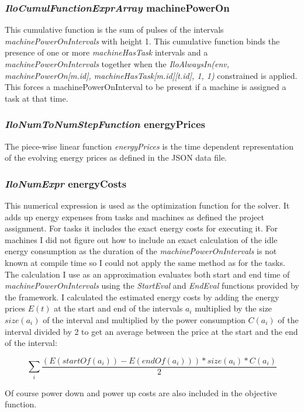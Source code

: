 \subsubsection{\textit{IloCumulFunctionExprArray} machinePowerOn}

This cumulative function is the sum of pulses of the intervals \textit{machinePowerOnIntervals} with height 1.
This cumulative function binds the presence of one or more \textit{machineHasTask} intervals and a \textit{machinePowerOnIntervals} together when the \textit{IloAlwaysIn(env, machinePowerOn[m.id], machineHasTask[m.id][t.id], 1, 1)} constrained is applied. This forces a machinePowerOnInterval to be present if a machine is assigned a task at that time. 

\subsubsection{\textit{IloNumToNumStepFunction} energyPrices}

The piece-wise linear function \textit{energyPrices} is the time dependent representation of the evolving energy prices as defined in the JSON data file.


\subsubsection{\textit{IloNumExpr} energyCosts}
This numerical expression is used as the optimization function for the solver. It adds up energy expenses from tasks and machines as defined the project assignment. For tasks it includes the exact energy costs for executing it. For machines I did not figure out how to include an exact calculation of the idle energy consumption as the duration of the \textit{machinePowerOnIntervals} is not known at compile time so I could not apply the same method as for the tasks. The calculation I use as an approximation evaluates both start and end time of \textit{machinePowerOnIntervals} using the \textit{StartEval} and \textit{EndEval} functions provided by the framework. I calculated the estimated energy costs by adding the energy prices $E(t)$ at the start and end of the intervals $a_i$ multiplied by the size $size(a_i)$ of the interval and multiplied by the power consumption $C(a_i)$ of the interval divided by 2 to get an average between the price at the start and the end of the interval:

\[ \sum_i{\frac{(E(startOf(a_i)) - E(endOf(a_i)))*size(a_i)*C(a_i)}{2}} \]

Of course power down and power up costs are also included in the objective function.



